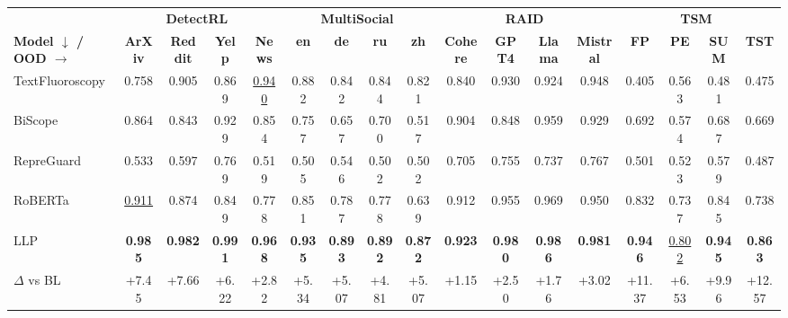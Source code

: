 \begin{tabular}{lcccccccccccccccc}
\toprule
& \multicolumn{4}{c}{\textbf{DetectRL~\citep{wu2024detectrl}}} & \multicolumn{4}{c}{\textbf{MultiSocial~\citep{macko2025multi}}} & \multicolumn{4}{c}{\textbf{RAID~\cite{dugan2024raid}}} & \multicolumn{4}{c}{\textbf{TSM~\citep{quaremba2026tsm}}} \\
\cmidrule(lr){2-5}\cmidrule(lr){6-9}\cmidrule(lr){10-13}\cmidrule(lr){14-17}
\textbf{Model $\downarrow$ / OOD $\rightarrow$} & \textbf{ArXiv} & \textbf{Reddit} & \textbf{Yelp} & \textbf{News} & \textbf{en} & \textbf{de} & \textbf{ru} & \textbf{zh} & \textbf{Cohere} & \textbf{GPT4} & \textbf{Llama} & \textbf{Mistral} & \textbf{FP} & \textbf{PE} & \textbf{SUM} & \textbf{TST} \\
\midrule
TextFluoroscopy & 0.758 & 0.905 & 0.869 & \cellcolor{orange!25}\underline{0.940} & 0.882 & 0.842 & 0.844 & 0.821 & 0.840 & 0.930 & 0.924 & 0.948 & 0.405 & 0.563 & 0.481 & 0.475 \\
BiScope & 0.864 & 0.843 & 0.929 & 0.854 & 0.757 & 0.657 & 0.700 & 0.517 & 0.904 & 0.848 & 0.959 & 0.929 & 0.692 & 0.574 & 0.687 & 0.669 \\
RepreGuard & 0.533 & 0.597 & 0.769 & 0.519 & 0.505 & 0.546 & 0.502 & 0.502 & 0.705 & 0.755 & 0.737 & 0.767 & 0.501 & 0.523 & 0.579 & 0.487 \\
RoBERTa & \cellcolor{orange!25}\underline{0.911} & 0.874 & 0.849 & 0.778 & 0.851 & 0.787 & 0.778 & 0.639 & 0.912 & 0.955 & 0.969 & 0.950 & 0.832 & 0.737 & 0.845 & 0.738 \\
\midrule
LLP & \cellcolor{cyan!25}\textbf{0.985} & \cellcolor{cyan!25}\textbf{0.982} & \cellcolor{cyan!25}\textbf{0.991} & \cellcolor{cyan!25}\textbf{0.968} & \cellcolor{cyan!25}\textbf{0.935} & \cellcolor{cyan!25}\textbf{0.893} & \cellcolor{cyan!25}\textbf{0.892} & \cellcolor{cyan!25}\textbf{0.872} & \cellcolor{cyan!25}\textbf{0.923} & \cellcolor{cyan!25}\textbf{0.980} & \cellcolor{cyan!25}\textbf{0.986} & \cellcolor{cyan!25}\textbf{0.981} & \cellcolor{cyan!25}\textbf{0.946} & \cellcolor{orange!25}\underline{0.802} & \cellcolor{cyan!25}\textbf{0.945} & \cellcolor{cyan!25}\textbf{0.863} \\
\hspace*{1em}$\Delta$ vs BL & \textcolor{green!60!black}{+7.45} & \textcolor{green!60!black}{+7.66} & \textcolor{green!60!black}{+6.22} & \textcolor{green!60!black}{+2.82} & \textcolor{green!60!black}{+5.34} & \textcolor{green!60!black}{+5.07} & \textcolor{green!60!black}{+4.81} & \textcolor{green!60!black}{+5.07} & \textcolor{green!60!black}{+1.15} & \textcolor{green!60!black}{+2.50} & \textcolor{green!60!black}{+1.76} & \textcolor{green!60!black}{+3.02} & \textcolor{green!60!black}{+11.37} & \textcolor{green!60!black}{+6.53} & \textcolor{green!60!black}{+9.96} & \textcolor{green!60!black}{+12.57} \\

\end{tabular}
